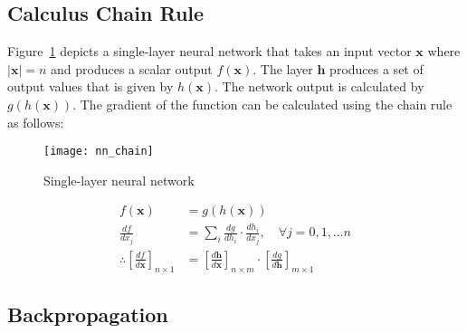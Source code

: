 \documentclass[10pt]{article}
\theoremstyle{definition}
\begin{document}
\subsection*{Calculus Chain Rule}

Figure~\ref{fig:sl_nn} depicts a single-layer neural network that takes an input vector $\mathbf{x}$ where $\lvert \mathbf{x} \rvert = n$ and produces a scalar output $f(\mathbf{x})$. The layer $\mathbf{h}$ produces a set of output values that is given by $h(\mathbf{x})$. The network output is calculated by $g(h(\mathbf{x}))$. The gradient of the function can be calculated using the chain rule as follows:

\begin{figure}[t]
\centering
\texttt{[image: nn\_chain]}
\caption{Single-layer neural network}
\label{fig:sl_nn}
\end{figure}

\begin{equation*}
\begin{aligned}
f(\mathbf{x}) & = g(h(\mathbf{x})) \\
\frac{df}{dx_j} & = \sum\limits_i \frac{dg}{dh_i} \cdot \frac{dh_i}{dx_j}, \quad \forall j = 0, 1, \hdots n\\
\therefore \left[\frac{df}{d\mathbf{x}}\right]_{n\times 1} & = \left[\frac{d\mathbf{h}}{d\mathbf{x}}\right]_{n\times m} \cdot \left[\frac{dg}{d\mathbf{h}}\right]_{m\times 1}
\end{aligned}
\end{equation*}

\subsection*{Backpropagation}
\end{document}
